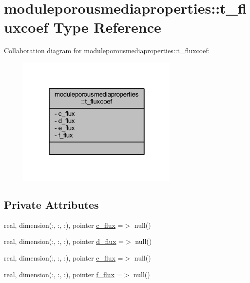 \hypertarget{structmoduleporousmediaproperties_1_1t__fluxcoef}{}\section{moduleporousmediaproperties\+:\+:t\+\_\+fluxcoef Type Reference}
\label{structmoduleporousmediaproperties_1_1t__fluxcoef}


Collaboration diagram for moduleporousmediaproperties\+:\+:t\+\_\+fluxcoef\+:\nopagebreak
\begin{figure}[H]
\begin{center}
\leavevmode
\includegraphics[width=226pt]{structmoduleporousmediaproperties_1_1t__fluxcoef__coll__graph}
\end{center}
\end{figure}
\subsection*{Private Attributes}
\begin{DoxyCompactItemize}
\item 
real, dimension(\+:, \+:, \+:), pointer \mbox{\hyperlink{structmoduleporousmediaproperties_1_1t__fluxcoef_afeee32fb503f629df94e74f97d85a20b}{c\+\_\+flux}} =$>$ null()
\item 
real, dimension(\+:, \+:, \+:), pointer \mbox{\hyperlink{structmoduleporousmediaproperties_1_1t__fluxcoef_a85de3411fbf994cd7134bececb5b674c}{d\+\_\+flux}} =$>$ null()
\item 
real, dimension(\+:, \+:, \+:), pointer \mbox{\hyperlink{structmoduleporousmediaproperties_1_1t__fluxcoef_a4ff42ba31300a085ea24932226d4e85d}{e\+\_\+flux}} =$>$ null()
\item 
real, dimension(\+:, \+:, \+:), pointer \mbox{\hyperlink{structmoduleporousmediaproperties_1_1t__fluxcoef_afeaf890ff5b46a9efc08f77660bde6a5}{f\+\_\+flux}} =$>$ null()
\end{DoxyCompactItemize}


